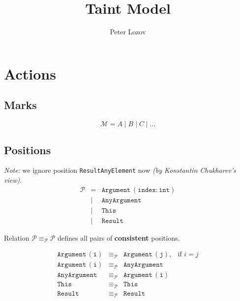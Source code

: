 \documentclass{article}
\title{Taint Model}
\author{Peter Lozov}
\date{}
\newcommand{\pEquiv}{\equiv_\mathcal{P}}
\begin{document}
\maketitle

\section{Actions}

\subsection{Marks}

\[
\mathcal{M} = A \mid B \mid C \mid \ldots
\]


\subsection{Positions}

\noindent \textit{Note:} we ignore position \texttt{ResultAnyElement} now \textit{(by Konstantin Chukharev's view)}.
\[
\begin{array}{rcl}
\mathcal{P} & =    & \texttt{Argument}\,(\texttt{index} : \texttt{int}) \\
            & \mid & \texttt{AnyArgument} \\
            & \mid & \texttt{This} \\
            & \mid & \texttt{Result}
\end{array}
\]

\noindent Relation $\mathcal{P} \pEquiv \mathcal{P}$ defines all pairs of \textbf{consistent} positions.

\[
\begin{array}{rcll}

 \texttt{Argument}\,(\texttt{i}) &
 \pEquiv &
 \texttt{Argument}\,(\texttt{j}), &
 \mbox{if } i = j \\

 \texttt{Argument}\,(\texttt{i}) &
 \pEquiv &

 \texttt{AnyArgument} \\

 \texttt{AnyArgument} &
 \pEquiv &
 \texttt{Argument}\,(\texttt{i}) \\

 \texttt{This} &
 \pEquiv &
 \texttt{This} \\

 \texttt{Result} &
 \pEquiv &
 \texttt{Result} \\
\end{array}
\]
\end{document}
